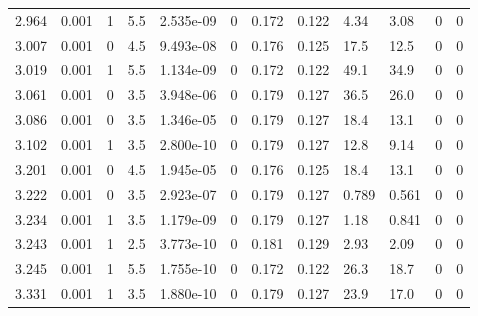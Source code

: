 \documentclass[preview]{standalone}
\begin{document}
{{{\begin{tabular}{L{1.2cm}C{1.2cm} C{0.3cm}C{0.5cm} C{1.4cm}C{1.4cm} C{1.4cm}C{1.4cm} C{1.6cm}C{1.6cm} C{1.6cm}C{1.6cm}}
  2.964  &  0.001  & 1     & 5.5 &  2.535e-09  & 0  &  0.172&   0.122& 4.34 & 3.08   &  0 & 0  \\ 
  3.007  &  0.001  & 0     & 4.5 &  9.493e-08  & 0  &  0.176&   0.125& 17.5 & 12.5   &  0 & 0  \\ 
  3.019  &  0.001  & 1     & 5.5 &  1.134e-09  & 0  &  0.172&   0.122& 49.1 & 34.9   &  0 & 0  \\ 
  3.061  &  0.001  & 0     & 3.5 &  3.948e-06  & 0  &  0.179&   0.127& 36.5 & 26.0   &  0 & 0  \\ 
  3.086  &  0.001  & 0     & 3.5 &  1.346e-05  & 0  &  0.179&   0.127& 18.4 & 13.1   &  0 & 0  \\ 
  3.102  &  0.001  & 1     & 3.5 &  2.800e-10  & 0  &  0.179&   0.127& 12.8 & 9.14   &  0 & 0  \\ 
  3.201  &  0.001  & 0     & 4.5 &  1.945e-05  & 0  &  0.176&   0.125& 18.4 & 13.1   &  0 & 0  \\ 
  3.222  &  0.001  & 0     & 3.5 &  2.923e-07  & 0  &  0.179&   0.127& 0.789 & 0.561   &  0 & 0  \\ 
  3.234  &  0.001  & 1     & 3.5 &  1.179e-09  & 0  &  0.179&   0.127& 1.18 & 0.841   &  0 & 0  \\ 
  3.243  &  0.001  & 1     & 2.5 &  3.773e-10  & 0  &  0.181&   0.129& 2.93 & 2.09   &  0 & 0  \\ 
  3.245  &  0.001  & 1     & 5.5 &  1.755e-10  & 0  &  0.172&   0.122& 26.3 & 18.7   &  0 & 0  \\ 
  3.331  &  0.001  & 1     & 3.5 &  1.880e-10  & 0  &  0.179&   0.127& 23.9 & 17.0   &  0 & 0  \\ 
\hline 
\end{tabular} 

}}}
\end{document}
